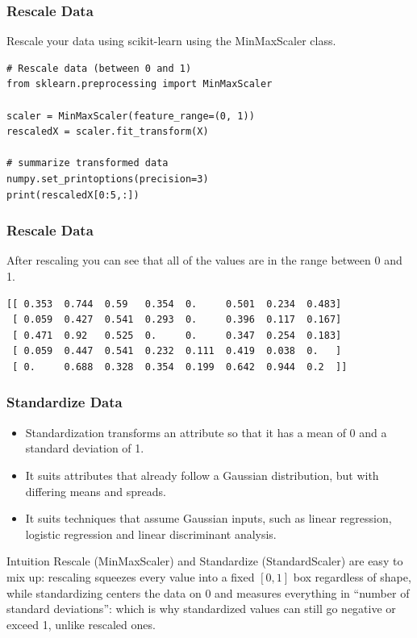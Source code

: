 \begin{frame}[fragile]\frametitle{Rescale Data}
Rescale your data using scikit-learn using the MinMaxScaler class.
\begin{lstlisting}
# Rescale data (between 0 and 1)
from sklearn.preprocessing import MinMaxScaler

scaler = MinMaxScaler(feature_range=(0, 1))
rescaledX = scaler.fit_transform(X)

# summarize transformed data
numpy.set_printoptions(precision=3)
print(rescaledX[0:5,:])
\end{lstlisting}
\end{frame}

\begin{frame}[fragile]\frametitle{Rescale Data}
After rescaling you can see that all of the values are in the range between 0 and 1.
\begin{lstlisting}
[[ 0.353  0.744  0.59   0.354  0.     0.501  0.234  0.483]
 [ 0.059  0.427  0.541  0.293  0.     0.396  0.117  0.167]
 [ 0.471  0.92   0.525  0.     0.     0.347  0.254  0.183]
 [ 0.059  0.447  0.541  0.232  0.111  0.419  0.038  0.   ]
 [ 0.     0.688  0.328  0.354  0.199  0.642  0.944  0.2  ]]
\end{lstlisting}
\end{frame}


\begin{frame}[fragile]\frametitle{Standardize Data}

	\begin{itemize}
	\item Standardization transforms an attribute so that it has a mean of 0 and a standard deviation of 1.
	\item It suits attributes that already follow a Gaussian distribution, but with differing means and spreads.
	\item It suits techniques that assume Gaussian inputs, such as linear regression, logistic regression and linear discriminant analysis.
	\end{itemize}

\begin{block}{Intuition}
Rescale (MinMaxScaler) and Standardize (StandardScaler) are easy to mix up: rescaling squeezes every value into a fixed $[0,1]$ box regardless of shape, while standardizing centers the data on 0 and measures everything in ``number of standard deviations'': which is why standardized values can still go negative or exceed 1, unlike rescaled ones.
\end{block}

\end{frame}


